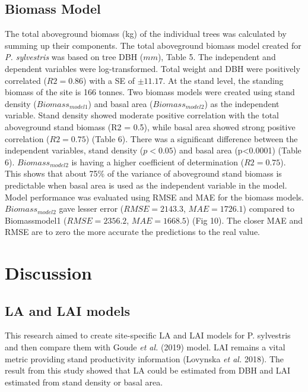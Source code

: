 \documentclass[11pt, a4paper]{report}
\begin{document}
\section{Biomass Model}
The total aboveground biomass (kg) of the individual trees was calculated by summing up their components. The total aboveground biomass model created for \textit{P. sylvestris} was based on tree DBH ($mm$), Table 5. The independent and dependent variables were log-transformed. Total weight and DBH were positively correlated ($R2 = 0.86$) with a SE of $±11.17$.
At the stand level, the standing biomass of the site is 166 tonnes. Two biomass models were created using stand density ($Biomass_{model1}$) and basal area ($Biomass_{model2}$) as the independent variable. Stand density showed moderate positive correlation with the total aboveground stand biomass (R2 = 0.5), while basal area showed strong positive correlation ($R2 = 0.75$) (Table 6). There was a significant difference between the independent variables, stand density ($p< 0.05$) and basal area (p<0.0001) (Table 6). $Biomass_{model2}$ is having a higher coefficient of determination ($R2 = 0.75$). This shows that about 75\% of the variance of aboveground stand biomass is predictable when basal area is used as the independent variable in the model.
Model performance was evaluated using RMSE and MAE for the biomass models. $Biomass_{model2}$ gave lesser error ($RMSE = 2143.3$, $MAE = 1726.1$) compared to Biomassmodel1 ($RMSE = 2356.2$, $MAE = 1668.5$) (Fig 10). The closer MAE and RMSE are to zero the more accurate the predictions to the real value.

\chapter{Discussion}
\section{LA and LAI models}
This research aimed to create site-specific LA and LAI models for P. sylvestris and then compare them with Goude \textit{et al.} (2019) model. LAI remains a vital metric providing stand productivity information (Lovynska \textit{et al.} 2018). The result from this study showed that LA could be estimated from DBH and LAI estimated from stand density or basal area.
\end{document}
